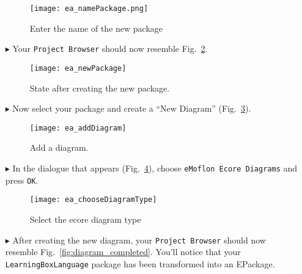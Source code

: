 \begin{itemize}
\begin{figure}[htbp]
	\centering
    \texttt{[image: ea\_namePackage.png]}
	\caption{Enter the name of the new package}
	\label{fig:new_package_name}
\end{figure}
\FloatBarrier

\vspace{0.5cm}

\item[$\blacktriangleright$] Your \texttt{Project Browser} should now resemble Fig.~\ref{fig:new_package_completed}.

\vspace{0.5cm}

\begin{figure}[htbp]
	\centering
  \texttt{[image: ea\_newPackage]}
	\caption{State after creating the new package.}
	\label{fig:new_package_completed}
\end{figure}
\FloatBarrier


\vspace{0.5cm}

\item[$\blacktriangleright$] Now select your package and create a ``New Diagram'' (Fig.~\ref{fig:diagram}).

\vspace{0.5cm}

\begin{figure}[htbp]
	\centering
  \texttt{[image: ea\_addDiagram]}
	\caption{Add a diagram.}
	\label{fig:diagram}
\end{figure}
\FloatBarrier

\clearpage

\item[$\blacktriangleright$] In the dialogue that appears (Fig.~\ref{fig:diagram_type}), choose \texttt{eMoflon Ecore Diagrams} and press \texttt{OK}. 

\begin{figure}[htbp]
	\centering
  \texttt{[image: ea\_chooseDiagramType]}
	\caption{Select the ecore diagram type}
	\label{fig:diagram_type}
\end{figure}
\FloatBarrier

 
\item[$\blacktriangleright$] After creating the new diagram, your  \texttt{Project Browser} should now resemble Fig.~\ref{fig:diagram_completed}. You'll notice
that your \texttt{LearningBoxLanguage} package has been transformed into an EPackage.


\end{itemize}
